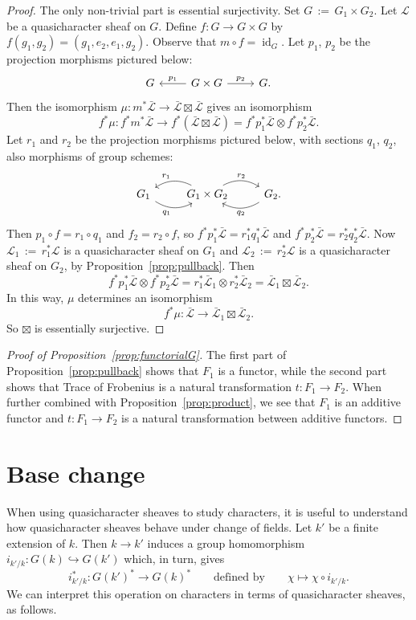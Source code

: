 \documentclass[11pt]{amsart}
\theoremstyle{plain}
\theoremstyle{definition}
\theoremstyle{remark}
\DeclareMathOperator{\id}{id}
\newcommand{\ceq}{{\, :=\, }}
\newcommand{\qcs}[1]{{\mathcal{#1}}}
\newcommand{\gqcs}[1]{{\mathcal{\bar #1}}}
\begin{document}
\begin{proof}
The only non-trivial part is essential surjectivity. Set $G \ceq G_1\times G_2$.
Let $\qcs{L}$ be a quasicharacter sheaf on $G$. Define $f : G\to G\times G$
by $f(g_1,g_2) = (g_1,e_2,e_1,g_2)$. Observe that $m\circ f = \id_G$. 
Let $p_1$, $p_2$ be the projection morphisms pictured below:
\[
\begin{tikzcd}
G & \arrow[swap]{l}{p_1} G\times G \arrow{r}{p_2} & G.
\end{tikzcd}
\]
Then the isomorphism $\mu : m^* \gqcs{L} \to \gqcs{L}\boxtimes \gqcs{L}$ gives an isomorphism
\[
f^*\mu : f^* m^* \gqcs{L} \to f^*(\gqcs{L}\boxtimes \gqcs{L}) = f^*p_1^*\gqcs{L}\otimes f^* p_2^*\gqcs{L}.
\]
Let $r_1$ and $r_2$ be the projection morphisms pictured below, with sections $q_1$, $q_2$, also morphisms of group schemes:
\[
\begin{tikzcd}
G_1  \arrow[swap, bend right]{r}{q_1} &
\arrow[swap, bend right]{l}{r_1} G_1\times G_2 \arrow[bend left]{r}{r_2} &
\arrow[bend left]{l}{q_2} G_2.
\end{tikzcd}
\]
Then $p_1\circ f = r_1 \circ q_1$ and $f_2 = r_2\circ f$, 
so $f^*p_1^*\gqcs{L} = r_1^* q_1^* \gqcs{L}$ and $f^*p_2^*\gqcs{L} = r_2^* q_2^* \gqcs{L}$. 
Now $\qcs{L}_1 \ceq r_1^* \qcs{L}$ is a quasicharacter sheaf on $G_1$ 
and $\qcs{L}_2 \ceq r_2^* \qcs{L}$ is a quasicharacter sheaf on $G_2$, 
by Proposition~\ref{prop:pullback}. 
Then 
\[
f^*p_1^*\gqcs{L}\otimes f^* p_2^*\gqcs{L} = r_1^*\gqcs{L}_1\otimes r_2^* \gqcs{L}_2 = \gqcs{L}_1\boxtimes \gqcs{L}_2.
\]
In this way, $\mu$ determines an isomorphism
\[
f^*\mu : \gqcs{L} \to  \gqcs{L}_1\boxtimes \gqcs{L}_2.
\]
So $\boxtimes$ is essentially surjective.
\end{proof}

\begin{proof}[Proof of Proposition~\ref{prop:functorialG}]
The first part of Proposition~\ref{prop:pullback} shows that $F_1$ is a functor,
while the second part shows that Trace of Frobenius is a natural transformation
$t: F_1 \to F_2$. When further combined with Proposition~\ref{prop:product},
we see that $F_1$ is an additive functor and $t: F_1 \to F_2$ is a natural
transformation between additive functors.
\end{proof}

\section{Base change}\label{sec:basechange}

When using quasicharacter sheaves to study characters, it is useful to understand
how quasicharacter sheaves behave under change of fields.
Let $k'$ be a finite extension of $k$. Then $k\to k'$ induces a group homomorphism
$i_{k'/k} : G(k) \hookrightarrow G(k')$ which, in turn, gives
\[
i_{k'/k}^* : G(k')^* \to G(k)^* \qquad \text{defined by}\qquad \chi \mapsto \chi\circ i_{k'/k}.
\]
We can interpret this operation on characters in terms of quasicharacter sheaves, as follows.
%
\end{document}
